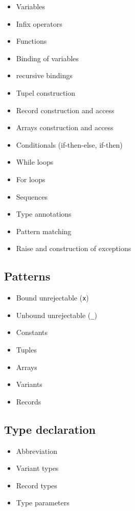 \documentclass{article}
\newcommand\otem{\item[\checkmark]}
\begin{document}
\begin{multicols}{2}
\begin{itemize}
  \otem Variables
  \otem Infix operators
  \otem Functions
  \otem Binding of variables
  \item recursive bindings
  \item Tupel construction
  \item Record construction and access
  \item Arrays construction and access
  \item Conditionals (if-then-else, if-then)
  \item While loops
  \item For loops
  \item Sequences
  \item Type annotations
  \item Pattern matching
  \item Raise and construction of exceptions
\end{itemize}
\end{multicols}

\subsection{Patterns}

\begin{multicols}{2}
\begin{itemize}
  \item Bound unrejectable (\texttt{x}) 
  \item Unbound unrejectable (\texttt{\_})
  \item Constants
  \item Tuples
  \item Arrays
  \item Variants
  \item Records
\end{itemize}
\end{multicols}

\subsection{Type declaration}

\begin{multicols}{2}
\begin{itemize}
  \item Abbreviation
  \item Variant types
  \item Record types
  \item Type parameters
\end{itemize}
\end{multicols}
\end{document}
